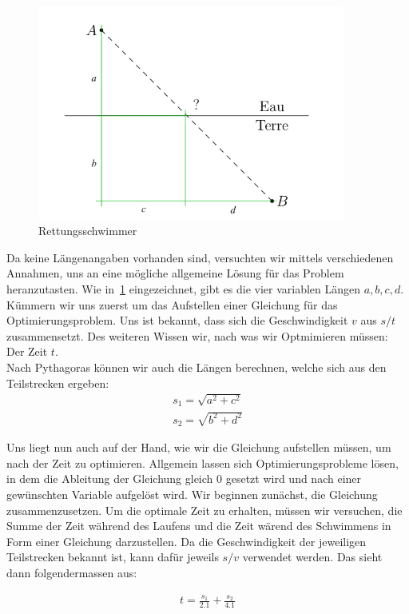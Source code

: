 \documentclass[10pt]{article}         %
\begin{document}
\begin{figure}[!ht]
    \centering
    \includegraphics[width=0.9\textwidth]{rettungsschwimmer}
    \caption{Rettungsschwimmer}\label{retts}
\end{figure}

Da keine Längenangaben vorhanden sind, versuchten wir mittels verschiedenen Annahmen, uns an eine mögliche allgemeine Lösung für das Problem heranzutasten. Wie in~\ref{retts} eingezeichnet, gibt es die vier variablen Längen $a, b, c, d$. Kümmern wir uns zuerst um das Aufstellen einer Gleichung für das Optimierungsproblem. Uns ist bekannt, dass sich die Geschwindigkeit $v$ aus $s/t$ zusammensetzt. Des weiteren Wissen wir, nach was wir Optmimieren müssen: Der Zeit $t$. \\
Nach Pythagoras können wir auch die Längen berechnen, welche sich aus den Teilstrecken ergeben:
\begin{align}
    s_1=\sqrt{a^2+c^2} \\
    s_2=\sqrt{b^2+d^2}
\end{align}

Uns liegt nun auch auf der Hand, wie wir die Gleichung aufstellen müssen, um nach der Zeit zu optimieren. Allgemein lassen sich Optimierungsprobleme lösen, in dem die Ableitung der Gleichung gleich 0 gesetzt wird und nach einer gewünschten Variable aufgelöst wird. Wir beginnen zunächst, die Gleichung zusammenzusetzen. Um die optimale Zeit zu erhalten, müssen wir versuchen, die Summe der Zeit während des Laufens und die Zeit wärend des Schwimmens in Form einer Gleichung darzustellen. Da die Geschwindigkeit der jeweiligen Teilstrecken bekannt ist, kann dafür jeweils $s/v$ verwendet werden. Das sieht dann folgendermassen aus:

\begin{align}
    t = \frac{s_1}{2.1} + \frac{s_2}{4.1}
\end{align}
\end{document}
